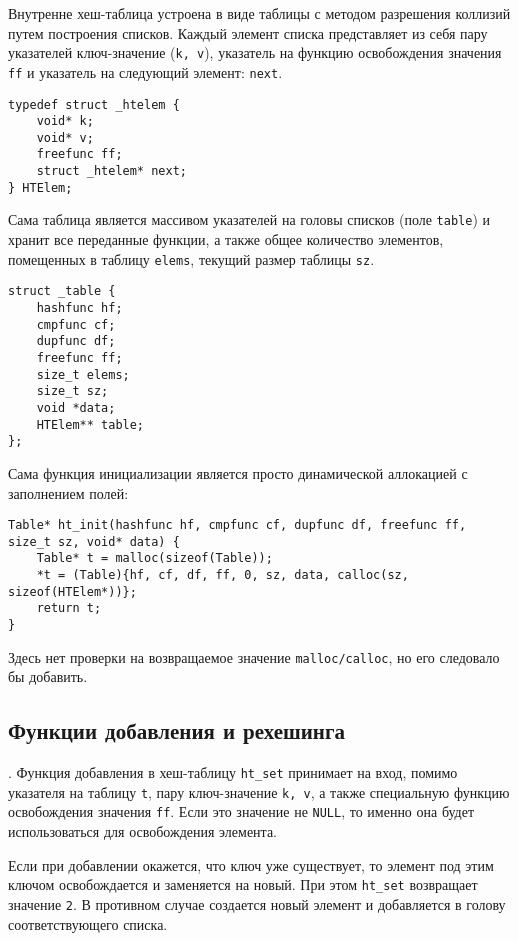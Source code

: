 \documentclass[10pt]{report}
\begin{document}
Внутренне хеш-таблица устроена в виде таблицы с методом разрешения коллизий путем построения списков.
Каждый элемент списка представляет из себя пару указателей ключ-значение (\texttt{k, v}), указатель на функцию освобождения значения \texttt{ff} и указатель на следующий элемент: \texttt{next}.
\begin{lstlisting}[firstnumber=6]
typedef struct _htelem {
	void* k;
	void* v;
	freefunc ff;
	struct _htelem* next;
} HTElem;
\end{lstlisting}
Сама таблица является массивом указателей на головы списков (поле \texttt{table}) и хранит все переданные функции, а также общее количество элементов, помещенных в таблицу \texttt{elems}, текущий размер таблицы \texttt{sz}. 
\begin{lstlisting}[firstnumber=13]
struct _table {
	hashfunc hf;
	cmpfunc cf;
	dupfunc df;
	freefunc ff;
	size_t elems;
	size_t sz;
	void *data;
	HTElem** table;
};
\end{lstlisting}
Сама функция инициализации является просто динамической аллокацией с заполнением полей:
\begin{lstlisting}[firstnumber=24]
Table* ht_init(hashfunc hf, cmpfunc cf, dupfunc df, freefunc ff, size_t sz, void* data) {
	Table* t = malloc(sizeof(Table));
	*t = (Table){hf, cf, df, ff, 0, sz, data, calloc(sz, sizeof(HTElem*))};
	return t;
}
\end{lstlisting}
Здесь нет проверки на возвращаемое значение \texttt{malloc/calloc}, но его следовало бы добавить.


\subsection{Функции добавления и рехешинга}.
Функция добавления в хеш-таблицу \texttt{ht\_set} принимает на вход, помимо указателя на таблицу \texttt{t}, пару
ключ-значение \texttt{k, v}, а также специальную функцию освобождения значения \texttt{ff}.
Если это значение не \texttt{NULL}, то именно она будет использоваться для освобождения элемента.

Если при добавлении окажется, что ключ уже существует, то элемент под этим ключом освобождается и заменяется на новый. При этом \texttt{ht\_set} возвращает значение {\tt 2}.
В противном случае создается новый элемент и добавляется в голову соответствующего списка.
\end{document}
